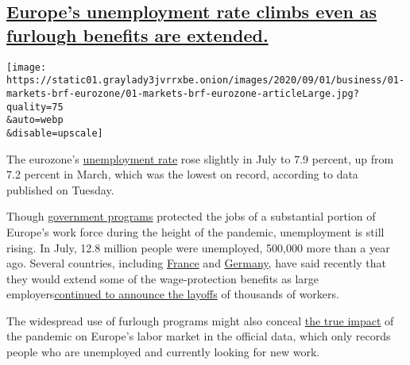 \hypertarget{europes-unemployment-rate-climbs-even-as-furlough-benefits-are-extended}{%
\subsection{\texorpdfstring{\protect\hyperlink{europes-unemployment-rate-climbs-even-as-furlough-benefits-are-extended}{Europe's
unemployment rate climbs even as furlough benefits are
extended.}}{Europe's unemployment rate climbs even as furlough benefits are extended.}}\label{europes-unemployment-rate-climbs-even-as-furlough-benefits-are-extended}}

\texttt{[image: https://static01.graylady3jvrrxbe.onion/images/2020/09/01/business/01-markets-brf-eurozone/01-markets-brf-eurozone-articleLarge.jpg?quality=75\\\&auto=webp\\\&disable=upscale]}

The eurozone's
\href{https://ec.europa.eu/eurostat/documents/2995521/10568643/3-01092020-BP-EN.pdf/39668e66-2fd4-4ec0-9fd4-4d7c99306c98}{unemployment
rate} rose slightly in July to 7.9 percent, up from 7.2 percent in
March, which was the lowest on record, according to data published on
Tuesday.

Though
\href{https://www.nytimes3xbfgragh.onion/2020/08/24/business/europe-economy-layoffs.html}{government
programs} protected the jobs of a substantial portion of Europe's work
force during the height of the pandemic, unemployment is still rising.
In July, 12.8 million people were unemployed, 500,000 more than a year
ago. Several countries, including
\href{https://www.bloomberg.com/news/articles/2020-06-24/france-outlines-new-virus-furloughs-that-could-run-for-two-years\#:~:text=The\%20new\%20program\%20emulates\%20the,jobs\%20during\%20the\%20pandemic\%20lockdown.\&text=If\%20unions\%20and\%20business\%20agree,at\%20the\%20Elysee\%20Palace\%20said.}{France}
and
\href{https://www.nytimes3xbfgragh.onion/live/2020/08/26/business/stock-market-updates-coronavirus\#germany-extends-worker-benefits-as-it-prepares-for-a-long-recovery}{Germany},
have said recently that they would extend some of the wage-protection
benefits as large
employers\href{https://www.nytimes3xbfgragh.onion/2020/08/24/business/europe-economy-layoffs.html}{continued
to announce the layoffs} of thousands of workers.

The widespread use of furlough programs might also conceal
\href{https://www.nytimes3xbfgragh.onion/2020/08/13/business/europe-precarious-workers.html}{the
true impact} of the pandemic on Europe's labor market in the official
data, which only records people who are unemployed and currently looking
for new work.

